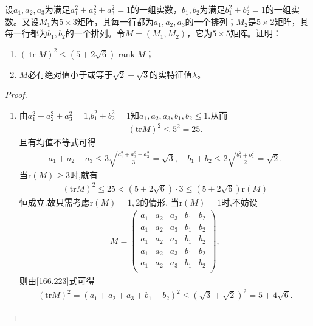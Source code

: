 \documentclass[../../main.tex]{subfiles}
\begin{document}
\begin{example}
设$a_1,a_2,a_3$为满足$a_1^2 + a_2^2 + a_3^2 = 1$的一组实数，$b_1,b_2$为满足$b_1^2 + b_2^2 = 1$的一组实数。又设$M_1$为$5 \times 3$矩阵，其每一行都为$a_1,a_2,a_3$的一个排列；$M_2$是$5 \times 2$矩阵，其每一行都为$b_1,b_2$的一个排列。令$M = (M_1,M_2)$，它为$5 \times 5$矩阵。证明：
\begin{enumerate}[(1)]
\item $(\operatorname{tr} M)^2 \leqslant (5 + 2\sqrt{6})\operatorname{rank} M$；

\item $M$必有绝对值小于或等于$\sqrt{2} + \sqrt{3}$的实特征值$\lambda$。
\end{enumerate}
\end{example}
\begin{proof}
\begin{enumerate}[(1)]
\item 由$a_{1}^{2}+a_{2}^{2}+a_{3}^{2}=1$,$b_{1}^{2}+b_{2}^{2}=1$知$a_1,a_2,a_3,b_1,b_2\leqslant 1$.从而
\begin{align*}
\left( \mathrm{tr}M \right) ^2\leqslant 5^2=25.
\end{align*}
且有均值不等式可得
\begin{align}
a_1+a_2+a_3\leqslant 3\sqrt{\frac{a_{1}^{2}+a_{2}^{2}+a_{3}^{2}}{3}}=\sqrt{3},\quad b_1+b_2\leqslant 2\sqrt{\frac{b_{1}^{2}+b_{2}^{2}}{2}}=\sqrt{2}.\label{166.223}
\end{align}
当$\mathrm{r}\left( M \right) \geqslant 3$时,就有
\begin{align*}
\left( \mathrm{tr}M \right) ^2\leqslant 25<\left( 5+2\sqrt{6} \right) \cdot 3\leqslant \left( 5+2\sqrt{6} \right) \mathrm{r}\left( M \right)
\end{align*}
恒成立.故只需考虑$\mathrm{r}\left( M \right) =1,2$的情形.
当$\mathrm{r}\left( M \right) =1$时,不妨设
\begin{align*}
M=\begin{pmatrix}
a_1&	a_2&	a_3&	b_1&	b_2\\
a_1&	a_2&	a_3&	b_1&	b_2\\
a_1&	a_2&	a_3&	b_1&	b_2\\
a_1&	a_2&	a_3&	b_1&	b_2\\
a_1&	a_2&	a_3&	b_1&	b_2\\
\end{pmatrix},
\end{align*}
则由\eqref{166.223}式可得
\begin{align*}
\left( \mathrm{tr}M \right) ^2=\left( a_1+a_2+a_3+b_1+b_2 \right) ^2\leqslant \left( \sqrt{3}+\sqrt{2} \right) ^2=5+4\sqrt{6}.

\end{align*}
\end{enumerate}
\end{proof}
\end{document}
